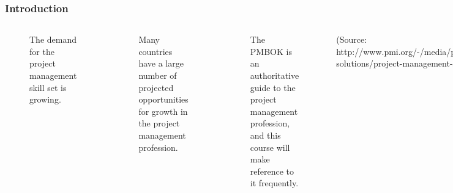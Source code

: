 \documentclass[aspectratio=169]{beamer}
\begin{document}
\begin{frame}[fragile]
\frametitle{Introduction}
\begin{columns}
\begin{figure}
\caption{The demand for the project management skill set is growing.}
\end{figure}
\vspace{-0.8cm}
\begin{figure}
\caption{Many countries have a large number of projected opportunities for growth in the project management profession.}
\end{figure}
\begin{figure}
\caption{The PMBOK is an authoritative guide to the project management profession, and this course will make reference to it frequently.}
\end{figure}
\vspace{-0.5cm}
\tiny (Source: http://www.pmi.org/-/media/pmi/documents/public/pdf/business-solutions/project-management-skills-gap-report.pdf)
\end{columns}
\end{frame}
\end{document}
